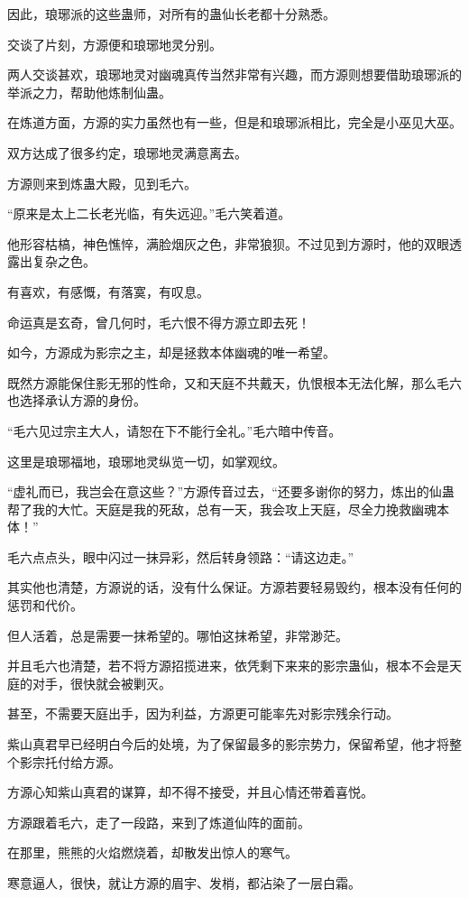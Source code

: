 \begin{this_body}
因此，琅琊派的这些蛊师，对所有的蛊仙长老都十分熟悉。

交谈了片刻，方源便和琅琊地灵分别。

两人交谈甚欢，琅琊地灵对幽魂真传当然非常有兴趣，而方源则想要借助琅琊派的举派之力，帮助他炼制仙蛊。

在炼道方面，方源的实力虽然也有一些，但是和琅琊派相比，完全是小巫见大巫。

双方达成了很多约定，琅琊地灵满意离去。

方源则来到炼蛊大殿，见到毛六。

“原来是太上二长老光临，有失远迎。”毛六笑着道。

他形容枯槁，神色憔悴，满脸烟灰之色，非常狼狈。不过见到方源时，他的双眼透露出复杂之色。

有喜欢，有感慨，有落寞，有叹息。

命运真是玄奇，曾几何时，毛六恨不得方源立即去死！

如今，方源成为影宗之主，却是拯救本体幽魂的唯一希望。

既然方源能保住影无邪的性命，又和天庭不共戴天，仇恨根本无法化解，那么毛六也选择承认方源的身份。

“毛六见过宗主大人，请恕在下不能行全礼。”毛六暗中传音。

这里是琅琊福地，琅琊地灵纵览一切，如掌观纹。

“虚礼而已，我岂会在意这些？”方源传音过去，“还要多谢你的努力，炼出的仙蛊帮了我的大忙。天庭是我的死敌，总有一天，我会攻上天庭，尽全力挽救幽魂本体！”

毛六点点头，眼中闪过一抹异彩，然后转身领路：“请这边走。”

其实他也清楚，方源说的话，没有什么保证。方源若要轻易毁约，根本没有任何的惩罚和代价。

但人活着，总是需要一抹希望的。哪怕这抹希望，非常渺茫。

并且毛六也清楚，若不将方源招揽进来，依凭剩下来来的影宗蛊仙，根本不会是天庭的对手，很快就会被剿灭。

甚至，不需要天庭出手，因为利益，方源更可能率先对影宗残余行动。

紫山真君早已经明白今后的处境，为了保留最多的影宗势力，保留希望，他才将整个影宗托付给方源。

方源心知紫山真君的谋算，却不得不接受，并且心情还带着喜悦。

方源跟着毛六，走了一段路，来到了炼道仙阵的面前。

在那里，熊熊的火焰燃烧着，却散发出惊人的寒气。

寒意逼人，很快，就让方源的眉宇、发梢，都沾染了一层白霜。


\end{this_body}
